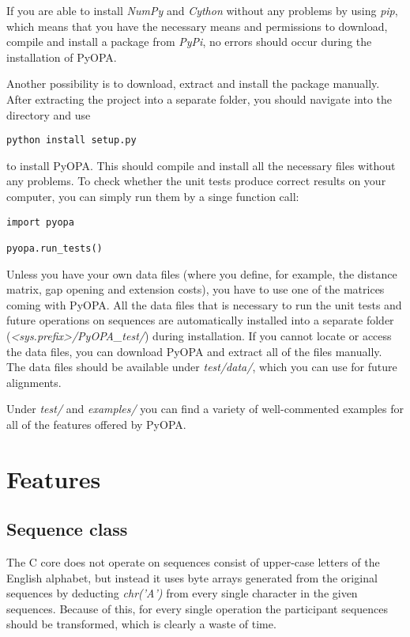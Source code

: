 \documentclass[12pt]{article}
\newcommand{\pp}{PyOPA}
\begin{document}
If you are able to install \emph{NumPy} and \emph{Cython} without any problems by using \emph{pip}, which means that you have the necessary means and permissions to download, compile and install a package from \emph{PyPi}, no errors should occur during the installation of \pp{}.

Another possibility is to download, extract and install the package manually. After extracting the project into a separate folder, you should navigate into the directory and use

\begin{lstlisting}
python install setup.py
\end{lstlisting}

to install \pp{}. This should compile and install all the necessary files without any problems. To check whether the unit tests produce correct results on your computer, you can simply run them by a singe function call:
\begin{lstlisting}
import pyopa

pyopa.run_tests()
\end{lstlisting}

Unless you have your own data files (where you define, for example, the distance matrix, gap opening and extension costs), you have to use one of the matrices coming with \pp{}. All the data files that is necessary to run the unit tests and future operations on sequences are automatically installed into a separate folder (\emph{\textless{}sys.prefix\textgreater/\pp{}\_test/}) during installation. If you cannot locate or access the data files, you can download \pp{} and extract all of the files manually. The data files should be available under \emph{test/data/}, which you can use for future alignments. 

Under \emph{test/} and \emph{examples/} you can find a variety of well-commented examples for all of the features offered by \pp{}.

\section{Features}
\label{sec:features}

\subsection{Sequence class}
\label{subsec:normseq}
The C core does not operate on sequences consist of upper-case letters of the English alphabet, but instead it uses byte arrays generated from the original sequences by deducting \emph{chr('A')} from every single character in the given sequences. Because of this, for every single operation the participant sequences should be transformed, which is clearly a waste of time.
\end{document}
